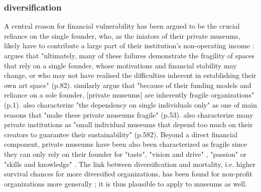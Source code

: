 \documentclass[12pt]{article}
\begin{document}
\subsubsection*{diversification}




A central reason for financial vulnerability has been argued to be the crucial reliance on the single founder, who, as the iniators of their private museums, likely have to contribute a large part of their institution's non-operating income \parencite{Frey_Meier_2002_beyeler}:
\textcite{Adam_2021_rise} argues that "ultimately, many of these failures demonstrate the fragility of spaces that rely on a single founder, whose motivations and financial stability may change, or who may not have realised the difficulties inherent in establishing their own art space" (p.82).
\textcite{Velthuis_Gera_2024_fragility} similarly argue that "because of their funding models and reliance on a sole founder, [private museums] are inherently fragile organizations" (p.1).
\textcite{Bechtler_Imhof_2018_future} also characterize "the dependency on single individuals only" as one of main reasons that "make these private museums fragile" (p.53).
\cite{StylianouLambert_etal_2014_museums} also characterize many private institutions as "small individual museums that depend too much on their creators to guarantee their sustainability" (p.582).
Beyond a direct financial component, private museums have been also been characterized as fragile since they can only rely on their founder for "taste", "vision and drive" \parencite[p.77]{Adam_2021_rise}, "passion" \parencite[p.234]{Walker_2019_collector} or "skills and knowledge" \parencite[p.580]{StylianouLambert_etal_2014_museums}.
The link between diversification and mortality, i.e. higher survival chances for more diversified organizations, has been found for non-profit organizations more generally \parencite{Fernandez_2007_dissolution,Bielefeld_1994_survival,Hager_2001_vulnerability,Lu_Shon_Zhang_2019_dissolution}; it is thus plausible to apply to museums as well.
\end{document}
